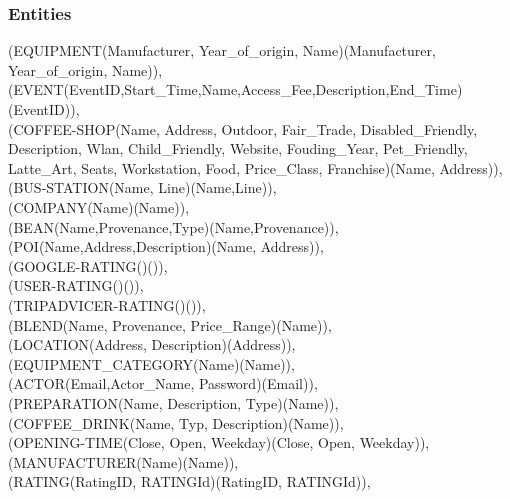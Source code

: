 { 
\subsubsection{Entities}
(EQUIPMENT(Manufacturer, Year\_of\_origin, Name)(Manufacturer, Year\_of\_origin, Name)),\\
(EVENT(EventID,Start\_Time,Name,Access\_Fee,Description,End\_Time)(EventID)),\\
(COFFEE-SHOP(Name, Address, Outdoor, Fair\_Trade, Disabled\_Friendly, Description, Wlan, Child\_Friendly, Website, Fouding\_Year, Pet\_Friendly, Latte\_Art, Seats, Workstation, Food, Price\_Class, Franchise)(Name, Address)), \\
(BUS-STATION(Name, Line)(Name,Line)),\\
(COMPANY(Name)(Name)),\\
(BEAN(Name,Provenance,Type)(Name,Provenance)),\\
(POI(Name,Address,Description)(Name, Address)), \\
(GOOGLE-RATING()()), \\
(USER-RATING()()), \\
(TRIPADVICER-RATING()()), \\
(BLEND(Name, Provenance, Price\_Range)(Name)), \\
(LOCATION(Address, Description)(Address)), \\
(EQUIPMENT\_CATEGORY(Name)(Name)), \\
(ACTOR(Email,Actor\_Name, Password)(Email)), \\
(PREPARATION(Name, Description, Type)(Name)), \\
(COFFEE\_DRINK(Name, Typ, Description)(Name)), \\
(OPENING-TIME(Close, Open, Weekday)(Close, Open, Weekday)), \\
(MANUFACTURER(Name)(Name)), \\
(RATING(RatingID, RATINGId)(RatingID, RATINGId)),  \\
}
